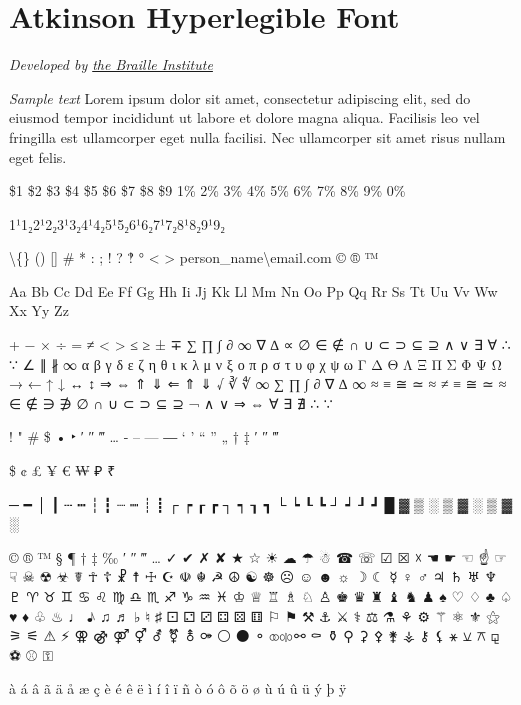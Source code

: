 \section{Atkinson Hyperlegible Font}\label{trouble6}
\emph{Developed by \href{https://brailleinstitute.org/freefont}{the Braille Institute}}
\begin{raggedright}
\emph{Sample text}
Lorem ipsum dolor sit amet, consectetur adipiscing elit, sed do eiusmod tempor incididunt ut labore et dolore magna aliqua. Facilisis leo vel fringilla est ullamcorper eget nulla facilisi. Nec ullamcorper sit amet risus nullam eget felis.

\$1 \$2 \$3 \$4 \$5 \$6 \$7 \$8 \$9 1\% 2\% 3\% 4\% 5\% 6\% 7\% 8\% 9\% 0\%

1¹1₂2¹2₂3¹3₂4¹4₂5¹5₂6¹6₂7¹7₂8¹8₂9¹9₂

\textbackslash\{\} () [] \# * : ; ! ? ‽ ° \textless{} \textgreater{} person\_name\textbackslash{}email.com © ® ™

Aa Bb Cc Dd Ee Ff Gg Hh Ii Jj Kk Ll Mm Nn Oo Pp Qq Rr Ss Tt Uu Vv Ww Xx Yy Zz

+ − × ÷ = ≠ < > ≤ ≥ ± ∓
∑ ∏ ∫ ∂ ∞ ∇ ∆ ∝ ∅ ∈ ∉ ∩ ∪ ⊂ ⊃ ⊆ ⊇ ∧ ∨ ∃ ∀ ∴ ∵ ∠ ∥ ∦ ∞
α β γ δ ε ζ η θ ι κ λ μ ν ξ ο π ρ σ τ υ φ χ ψ ω
Γ Δ Θ Λ Ξ Π Σ Φ Ψ Ω
→ ← ↑ ↓ ↔ ↕ ⇒ ⇔ ⇑ ⇓ ⇐ ⇑ ⇓
√ ∛ ∜ ∞ ∑ ∏ ∫ ∂ ∇ ∆ ∞ ≈ ≡ ≅ ≃ ≈ ≠ ≡ ≅ ≃ ≈
∈ ∉ ∋ ∌ ∅ ∩ ∪ ⊂ ⊃ ⊆ ⊇
¬ ∧ ∨ ⇒ ⇔ ∀ ∃ ∄ ∴ ∵

! " \# \$ %
• ‣ ′ ″ ‴ … ‐ – — ― ‘ ’ “ ” „ † ‡ ′ ″ ‴

\$ ¢ £ ¥ € ₩ ₽ ₹

─ ━ │ ┃ ┄ ┅ ┆ ┇ ┈ ┉ ┊ ┋ ┌ ┍ ┎ ┏ ┐ ┑ ┒ ┓ └ ┕ ┖ ┗ ┘ ┙ ┚ ┛
█ ▓ ▒ ░ ▒ ▓ ░ ▒ ▓ ░

© ® ™ § ¶ † ‡ ‰ ′ ″ ‴ … ✓ ✔ ✗ ✘ ★ ☆ ☀ ☁ ☂ ☃ ☎ ☏ ☑ ☒ ☓ ☚ ☛ ☜ ☝ ☞ ☟ ☠ ☢ ☣ ☤ ☥ ☦ ☧ ☨ ☩ ☪ ☫ ☬ ☭ ☮ ☯ ☸ ☹ ☺ ☻ ☼ ☽ ☾ ☿ ♀ ♂ ♃ ♄ ♅ ♆ ♇ ♈ ♉ ♊ ♋ ♌ ♍ ♎ ♏ ♐ ♑ ♒ ♓ ♔ ♕ ♖ ♗ ♘ ♙ ♚ ♛ ♜ ♝ ♞ ♟ ♠ ♡ ♢ ♣ ♤ ♥ ♦ ♧ ♨ ♩ ♪ ♫ ♬ ♭ ♮ ♯ ⚀ ⚁ ⚂ ⚃ ⚄ ⚅ ⚐ ⚑ ⚒ ⚓ ⚔ ⚕ ⚖ ⚗ ⚘ ⚙ ⚚ ⚛ ⚜ ⚝ ⚞ ⚟ ⚠ ⚡ ⚢ ⚣ ⚤ ⚥ ⚦ ⚧ ⚨ ⚩ ⚪ ⚫ ⚬ ⚭ ⚮ ⚯ ⚰ ⚱ ⚲ ⚳ ⚴ ⚵ ⚶ ⚷ ⚸ ⚹ ⚺ ⚻ ⚼ ⚽ ⚾ ⚿

à á â ã ä å æ ç è é ê ë ì í î ï ñ ò ó ô õ ö ø ù ú û ü ý þ ÿ

\end{raggedright}
\pagebreak
